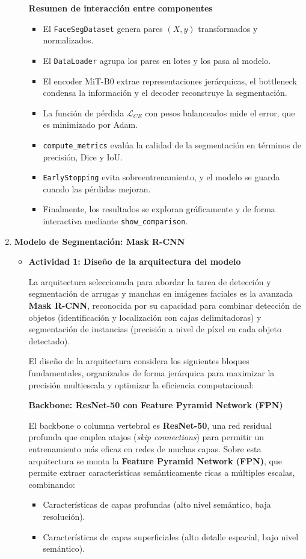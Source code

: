 \begin{enumerate}
\begin{itemize}
\textbf{Resumen de interacción entre componentes}
\begin{itemize}
  \item El \texttt{FaceSegDataset} genera pares \((X, y)\) transformados y normalizados.
  \item El \texttt{DataLoader} agrupa los pares en lotes y los pasa al modelo.
  \item El encoder MiT-B0 extrae representaciones jerárquicas, el bottleneck condensa la información y el decoder reconstruye la segmentación.
  \item La función de pérdida \(\mathcal{L}_{CE}\) con pesos balanceados mide el error, que es minimizado por Adam.
  \item \texttt{compute\_metrics} evalúa la calidad de la segmentación en términos de precisión, Dice y IoU.
  \item \texttt{EarlyStopping} evita sobreentrenamiento, y el modelo se guarda cuando las pérdidas mejoran.
  \item Finalmente, los resultados se exploran gráficamente y de forma interactiva mediante \texttt{show\_comparison}.
\end{itemize}

  \end{itemize}
  \item \textbf{Modelo de Segmentación: Mask R-CNN}
  \begin{itemize}
  \item\textbf{Actividad 1: Diseño de la arquitectura del modelo}

La arquitectura seleccionada para abordar la tarea de detección y segmentación de arrugas y manchas en imágenes faciales es la avanzada \textbf{Mask R-CNN}, reconocida por su capacidad para combinar detección de objetos (identificación y localización con cajas delimitadoras) y segmentación de instancias (precisión a nivel de píxel en cada objeto detectado).

El diseño de la arquitectura considera los siguientes bloques fundamentales, organizados de forma jerárquica para maximizar la precisión multiescala y optimizar la eficiencia computacional:

\textbf{Backbone: ResNet-50 con Feature Pyramid Network (FPN)}

El backbone o columna vertebral es \textbf{ResNet-50}, una red residual profunda que emplea atajos (\textit{skip connections}) para permitir un entrenamiento más eficaz en redes de muchas capas. Sobre esta arquitectura se monta la \textbf{Feature Pyramid Network (FPN)}, que permite extraer características semánticamente ricas a múltiples escalas, combinando:
\begin{itemize}
    \item Características de capas profundas (alto nivel semántico, baja resolución).
    \item Características de capas superficiales (alto detalle espacial, bajo nivel semántico).
\end{itemize}


\end{itemize}
\end{enumerate}
